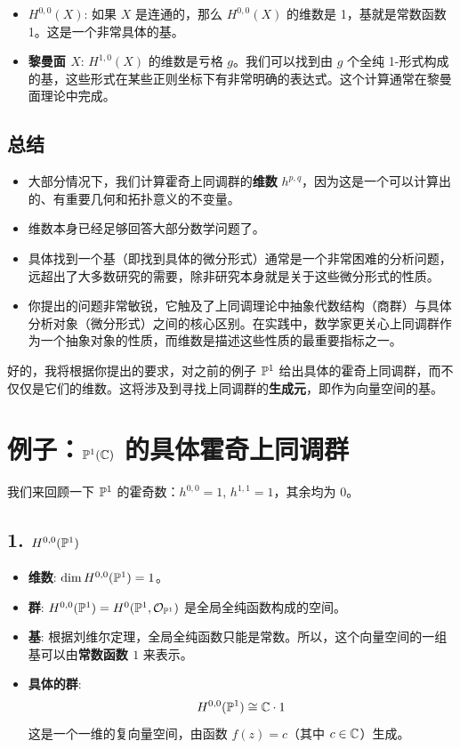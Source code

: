 \documentclass{amsart}
\let\originalmathbb\mathbb
\renewcommand{\mathbb}[1]{%
    \ifstrequal{#1}{1}{\mathbbm{#1}}{\originalmathbb{#1}}%
}
\theoremstyle{plain}
\theoremstyle{definition}
\theoremstyle{remark}
\begin{document}
\begin{itemize}
	\item \textbf{$H^{0,0}(X)$}: 如果 $X$ 是连通的，那么 $H^{0,0}(X)$ 的维数是 1，基就是常数函数 1。这是一个非常具体的基。
	\item \textbf{黎曼面 $X$}: $H^{1,0}(X)$ 的维数是亏格 $g$。我们可以找到由 $g$ 个全纯 1-形式构成的基，这些形式在某些正则坐标下有非常明确的表达式。这个计算通常在黎曼面理论中完成。
\end{itemize}

\subsection{总结}

\begin{itemize}
	\item 大部分情况下，我们计算霍奇上同调群的\textbf{维数} $h^{p,q}$，因为这是一个可以计算出的、有重要几何和拓扑意义的不变量。
	\item 维数本身已经足够回答大部分数学问题了。
	\item 具体找到一个基（即找到具体的微分形式）通常是一个非常困难的分析问题，远超出了大多数研究的需要，除非研究本身就是关于这些微分形式的性质。
	\item 你提出的问题非常敏锐，它触及了上同调理论中抽象代数结构（商群）与具体分析对象（微分形式）之间的核心区别。在实践中，数学家更关心上同调群作为一个抽象对象的性质，而维数是描述这些性质的最重要指标之一。
\end{itemize}

好的，我将根据你提出的要求，对之前的例子 $\mathbb{P}^1$ 给出具体的霍奇上同调群，而不仅仅是它们的维数。这将涉及到寻找上同调群的\textbf{生成元}，即作为向量空间的基。

\section{例子：\texorpdfstring{$\mathbb{P}^1(\mathbb{C})$}{P^1(C)} 的具体霍奇上同调群}

我们来回顾一下 $\mathbb{P}^1$ 的霍奇数：$h^{0,0}=1$, $h^{1,1}=1$，其余均为 0。

\subsection{1. \texorpdfstring{$H^{0,0}(\mathbb{P}^1)$}{H^0,0(P^1)}}

\begin{itemize}
	\item \textbf{维数}: $\dim H^{0,0}(\mathbb{P}^1) = 1$。
	\item \textbf{群}: $H^{0,0}(\mathbb{P}^1) = H^0(\mathbb{P}^1, \mathcal{O}_{\mathbb{P}^1})$ 是全局全纯函数构成的空间。
	\item \textbf{基}: 根据刘维尔定理，全局全纯函数只能是常数。所以，这个向量空间的一组基可以由\textbf{常数函数 $1$} 来表示。
	\item \textbf{具体的群}:
\[
H^{0,0}(\mathbb{P}^1) \cong \mathbb{C} \cdot 1
\]
这是一个一维的复向量空间，由函数 $f(z) = c$（其中 $c \in \mathbb{C}$）生成。
\end{itemize}
\end{document}
